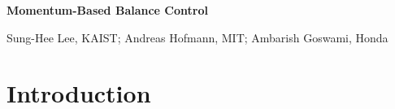 \documentclass{llncs}
\def\title#1{{\noindent\Large{\bf #1}\par}}
\def\author#1{\begin{center}{\sc #1\par}\end{center}}
\begin{document}
\pagestyle{empty}

\title{Momentum-Based Balance Control}
\author{Sung-Hee Lee, KAIST; Andreas Hofmann, MIT; Ambarish Goswami, Honda}

\section{Introduction}











\end{document}
